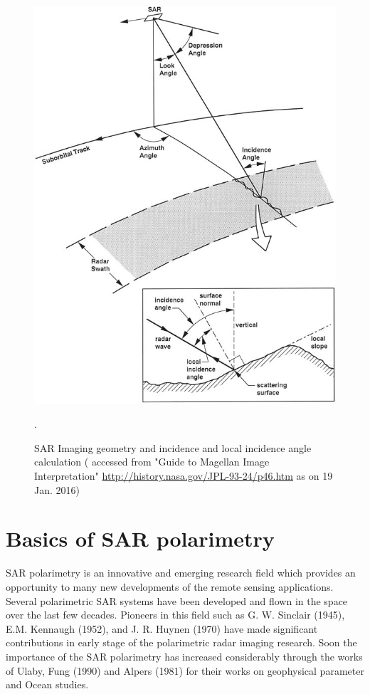 \begin{figure}[!ht]
	\centering
	\includegraphics[width=0.6\columnwidth]{Figure_General/incidence_angle} 
	\caption{SAR Imaging geometry and incidence and local incidence angle calculation \small( accessed from "Guide to Magellan Image Interpretation" \url{http://history.nasa.gov/JPL-93-24/p46.htm} as on 19 Jan. 2016)}.
	\label{fig:SAR_geometry}
\end{figure}

\section{Basics of SAR polarimetry}

SAR polarimetry is an innovative and emerging research field which provides an opportunity to many new developments of the remote sensing applications. Several polarimetric SAR systems have been developed and flown in the space over the last few decades. Pioneers in this field such as G. W. Sinclair (1945), E.M. Kennaugh (1952), and J. R. Huynen (1970) have made significant contributions in early stage of the polarimetric radar imaging research. Soon the importance of the SAR polarimetry has increased considerably through the works of Ulaby, Fung (1990) and Alpers (1981) for their works on geophysical parameter and Ocean studies. 

